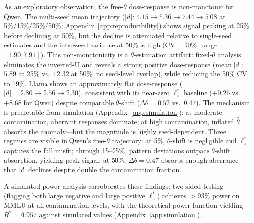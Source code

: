 As an exploratory observation, the free-$\theta$ dose-response is non-monotonic for Qwen.
The multi-seed mean trajectory ($|d|$: $4.15 \to 5.36 \to 7.44 \to 5.08$ at 5\%/15\%/25\%/50\%; Appendix~\ref{app:reproducibility}) shows signal peaking at 25\% before declining at 50\%, but the decline is attenuated relative to single-seed estimates and the inter-seed variance at 50\% is high (CV${=}$60\%, range $[1.90, 7.91]$).
This non-monotonicity is a $\theta$-estimation artifact: fixed-$\theta$ analysis eliminates the inverted-U and reveals a strong positive dose-response (mean $|d|$: $5.89$ at 25\% vs.\ $12.32$ at 50\%, no seed-level overlap), while reducing the 50\% CV to 19\%.
Llama shows an approximately flat dose-response ($|d|{=}2.80 \to 2.56 \to 2.30$), consistent with its near-zero $\ell_z^*$ baseline ($+0.26$ vs.\ ${+}8.68$ for Qwen) despite comparable $\theta$-shift ($\Delta\theta{=}0.52$ vs.\ $0.47$).
The mechanism is predictable from simulation (Appendix~\ref{app:simulation}): at moderate contamination, aberrant responses dominate; at high contamination, inflated $\hat{\theta}$ absorbs the anomaly---but the magnitude is highly seed-dependent.
Three regimes are visible in Qwen's free-$\theta$ trajectory: at 5\%, $\theta$-shift is negligible and $\ell_z^*$ captures the full misfit; through 15--25\%, pattern deviations outpace $\theta$-shift absorption, yielding peak signal; at 50\%, $\Delta\theta{=}0.47$ absorbs enough aberrance that $|d|$ declines despite double the contamination fraction.

A simulated power analysis corroborates these findings: two-sided testing (flagging both large negative and large positive $\ell_z^*$) achieves ${>}$93\% power on MMLU at all contamination levels, with the theoretical power function yielding $R^2 {=} 0.957$ against simulated values (Appendix~\ref{app:simulation}).
